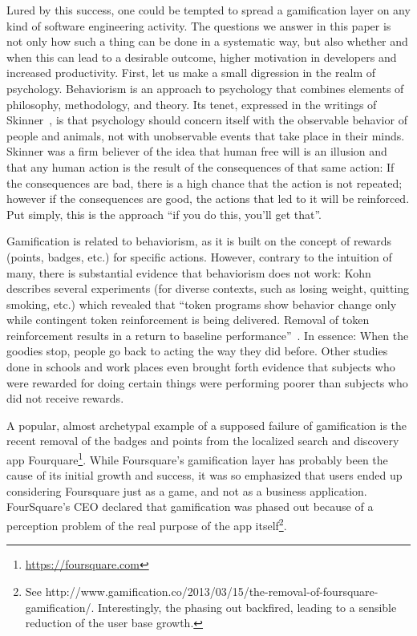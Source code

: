 Lured by this success, one could be tempted to spread a gamification layer on any kind of software engineering activity.
The questions we answer in this paper is not only how such a thing can be done in a systematic way, but also whether and when this can lead to a desirable outcome, \ie higher motivation in developers and increased productivity.
First, let us make a small digression in the realm of psychology.
Behaviorism is an approach to psychology that combines elements of philosophy, methodology, and theory.
Its tenet, expressed in the writings of Skinner~\cite{Skin1978a}, is that psychology should concern itself with the observable behavior of people and animals, not with unobservable events that take place in their minds.
Skinner was a firm believer of the idea that human free will is an illusion and that any human action is the result of the consequences of that same action: If the consequences are bad, there is a high chance that the action is not repeated; however if the consequences are good, the actions that led to it will be reinforced.
Put simply, this is the approach ``if you do this, you'll get that''.

Gamification is related to behaviorism, as it is built on the concept of rewards (points, badges, etc.) for specific actions.
However, contrary to the intuition of many, there is substantial evidence that behaviorism does not work: Kohn describes several experiments (for diverse contexts, such as losing weight, quitting smoking, etc.) which revealed that ``token programs show behavior change only while contingent token reinforcement is being delivered.
Removal of token reinforcement results in a return to baseline performance''~\cite{Kohn1993a}.
In essence: When the goodies stop, people go back to acting the way they did before.
Other studies done in schools and work places even brought forth evidence that subjects who were rewarded for doing certain things were performing poorer than subjects who did not receive rewards.

A popular, almost archetypal example of a supposed failure of gamification is the recent removal of the badges and points from the localized search and discovery app Fourquare\footnote{\url{https://foursquare.com}}.
While Foursquare's gamification layer has probably been the cause of its initial growth and success, it was so emphasized that users ended up considering Foursquare just as a game, and not as a business application.
FourSquare's CEO declared that gamification was phased out because of a perception problem of the real purpose of the app itself\footnote{See http://www.gamification.co/2013/03/15/the-removal-of-foursquare-gamification/.
Interestingly, the phasing out backfired, leading to a sensible reduction of the user base growth.}.

